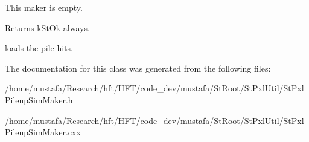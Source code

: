 This maker is empty. 

\begin{DoxyVerb} Returns kStOk always.
\end{DoxyVerb}


loads the pile hits. 

The documentation for this class was generated from the following files\-:\begin{DoxyCompactItemize}
\item 
/home/mustafa/\-Research/hft/\-H\-F\-T/code\-\_\-dev/mustafa/\-St\-Root/\-St\-Pxl\-Util/St\-Pxl\-Pileup\-Sim\-Maker.\-h\item 
/home/mustafa/\-Research/hft/\-H\-F\-T/code\-\_\-dev/mustafa/\-St\-Root/\-St\-Pxl\-Util/St\-Pxl\-Pileup\-Sim\-Maker.\-cxx\end{DoxyCompactItemize}
